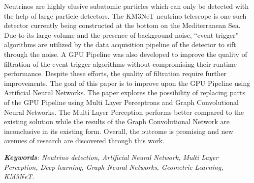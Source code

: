 


\begin{abstracts}        %

  Neutrinos are highly elusive subatomic particles which can only be
  detected with the help of large particle detectors. The KM3NeT
  neutrino telescope is one such detector currently being constructed
  at the bottom on the Mediterranean Sea. Due to its large volume and
  the presence of background noise, ``event trigger'' algorithms are
  utilized by the data acquisition pipeline of the detector to sift
  through the noise. A GPU Pipeline was also developed to improve the
  quality of filtration of the event trigger algorithms without
  compromising their runtime performance. Despite these efforts, the
  quality of filtration require further improvements. The goal of this
  paper is to improve upon the GPU Pipeline using Artificial Neural
  Networks. The paper explores the possibility of replacing parts of
  the GPU Pipeline using Multi Layer Perceptrons and Graph
  Convolutional Neural Networks. The Multi Layer Perception performs
  better compared to the existing solution while the results of the
  Graph Convolutional Network are inconclusive in its existing form.
  Overall, the outcome is promising and new avenues of research are
  discovered through this work.

  \emph{\textbf{Keywords}: Neutrino detection, Artificial Neural
  Network, Multi Layer Perception, Deep learning, Graph Neural
  Networks, Geometric Learning, KM3NeT.}
\end{abstracts}


